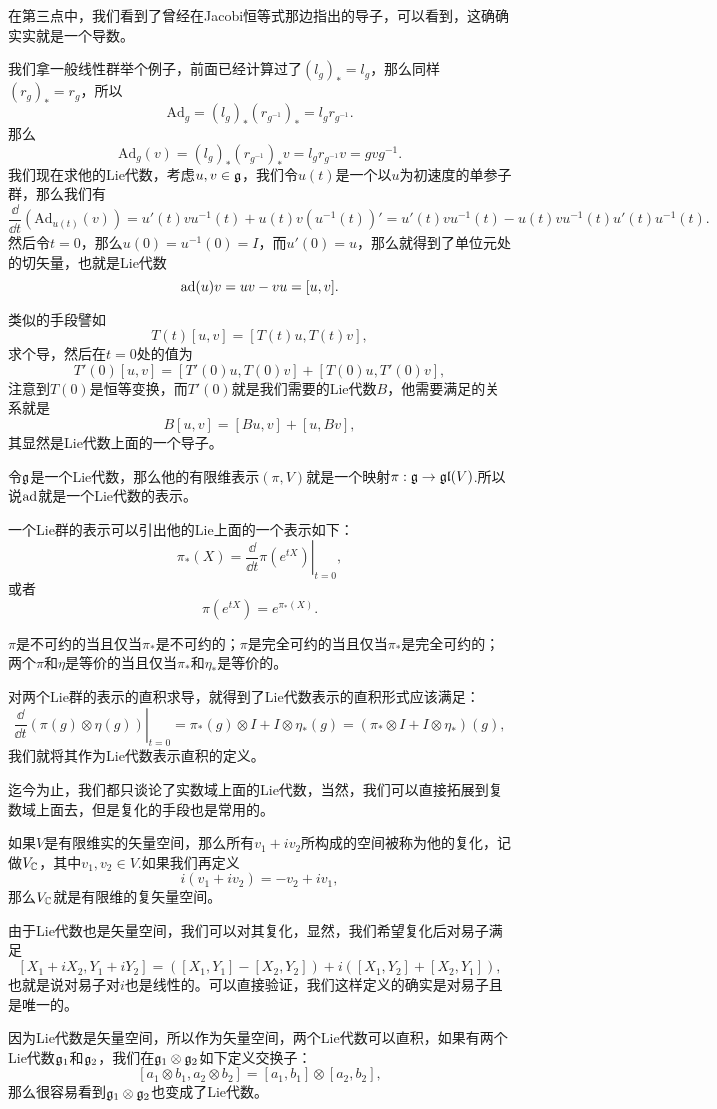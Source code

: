 在第三点中，我们看到了曾经在Jacobi恒等式那边指出的导子，可以看到，这确确实实就是一个导数。

我们拿一般线性群举个例子，前面已经计算过了$(l_g)_*=l_g$，那么同样$(r_g)_*=r_g$，所以
\[
	\mathrm{Ad}_g=(l_g)_*(r_{g^{-1}})_*=l_gr_{g^{-1}}.
\]
那么
\[
	\mathrm{Ad}_g(v)=(l_g)_*(r_{g^{-1}})_*v=l_gr_{g^{-1}}v=gvg^{-1}.
\]
我们现在求他的Lie代数，考虑$u,v\in {\mathfrak{g}}$，我们令$u(t)$是一个以$u$为初速度的单参子群，那么我们有
\[
\frac{\dd}{\dd t}(\mathrm{Ad}_{u(t)}(v))=u'(t)vu^{-1}(t)+u(t)v(u^{-1}(t))'=u'(t)vu^{-1}(t)-u(t)vu^{-1}(t)u'(t)u^{-1}(t).
\]
然后令$t=0$，那么$u(0)=u^{-1}(0)=I$，而$u'(0)=u$，那么就得到了单位元处的切矢量，也就是Lie代数
\[
\operatorname{ad}(u)v=uv-vu=[u,v].
\]

类似的手段譬如
\[
T(t)[u,v]=[T(t)u,T(t)v],
\]
求个导，然后在$t=0$处的值为
\[
T'(0)[u,v]=[T'(0)u,T(0)v]+[T(0)u,T'(0)v],
\]
注意到$T(0)$是恒等变换，而$T'(0)$就是我们需要的Lie代数$B$，他需要满足的关系就是
\[
B[u,v]=[Bu,v]+[u,Bv],
\]
其显然是Lie代数上面的一个导子。

\para 令${\mathfrak{g}}$是一个Lie代数，那么他的有限维表示$(\pi,V)$就是一个映射$\pi:{\mathfrak{g}}\to\mathfrak{gl}(V)$.所以说$\operatorname{ad}$就是一个Lie代数的表示。

一个Lie群的表示可以引出他的Lie上面的一个表示如下：
\[
	\pi_*(X)=\left.\frac{\dd}{\dd t}\pi(e^{tX})\right|_{t=0},
\]
或者
\[
	\pi(e^{tX})=e^{\pi_*(X)}.
\]

\pro $\pi$是不可约的当且仅当$\pi_*$是不可约的；$\pi$是完全可约的当且仅当$\pi_*$是完全可约的；两个$\pi$和$\eta$是等价的当且仅当$\pi_*$和$\eta_*$是等价的。

对两个Lie群的表示的直积求导，就得到了Lie代数表示的直积形式应该满足：
\[
	\left.\frac{\dd}{\dd t}(\pi(g)\otimes \eta(g))\right|_{t=0}=\pi_*(g)\otimes I+I\otimes \eta_*(g)=(\pi_*\otimes I+I\otimes \eta_*)(g),
\]
我们就将其作为Lie代数表示直积的定义。

迄今为止，我们都只谈论了实数域上面的Lie代数，当然，我们可以直接拓展到复数域上面去，但是复化的手段也是常用的。

\para 如果$V$是有限维实的矢量空间，那么所有$v_1+iv_2$所构成的空间被称为他的复化，记做$V_{\mathbb{C}}$，其中$v_1,v_2\in V$.如果我们再定义
\[
i(v_1+iv_2)=-v_2+iv_1,
\]
那么$V_{\mathbb{C}}$就是有限维的复矢量空间。

由于Lie代数也是矢量空间，我们可以对其复化，显然，我们希望复化后对易子满足
\[
[X_1+iX_2,Y_1+iY_2]=([X_1,Y_1]-[X_2,Y_2])+i([X_1,Y_2]+[X_2,Y_1]),
\]
也就是说对易子对$i$也是线性的。可以直接验证，我们这样定义的确实是对易子且是唯一的。

因为Lie代数是矢量空间，所以作为矢量空间，两个Lie代数可以直积，如果有两个Lie代数${\mathfrak{g}}_1$和${\mathfrak{g}}_2$，我们在${\mathfrak{g}}_1\otimes{\mathfrak{g}}_2$如下定义交换子：
\[
[a_1\otimes b_1,a_2\otimes b_2]=[a_1,b_1]\otimes [a_2,b_2],
\]
那么很容易看到${\mathfrak{g}}_1\otimes{\mathfrak{g}}_2$也变成了Lie代数。


